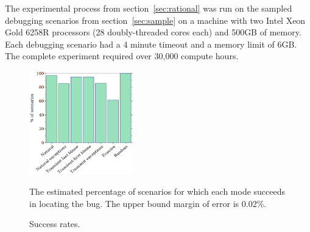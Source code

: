 
The experimental process from section~\ref{sec:rational} was run on the
sampled debugging scenarios from section~\ref{sec:sample} on a machine
with two Intel Xeon Gold 6258R processors (28 doubly-threaded cores each)
and 500GB of memory.  Each debugging scenario had a 4 minute timeout and a
memory limit of 6GB. The complete experiment required over 30,000 compute
hours.


\begin{figure}
  \includegraphics[width=0.40\textwidth]{./plots/success-bars}

  \vspace{1em}
  \begin{minipage}{0.95\textwidth}
  The estimated percentage of scenarios for which each mode succeeds in locating the bug.
  The upper bound margin of error is 0.02\%.
  \end{minipage}

  \caption{Success rates.}
  \label{fig:success-bars}
\end{figure}

